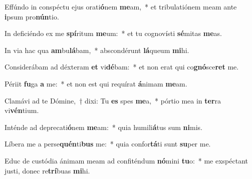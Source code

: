 \item Effúndo in conspéctu ejus orati\textbf{ó}nem \textbf{me}am,~* et tribulatiónem meam ante \textbf{i}psum pro\textbf{nún}tio.
\item In deficiéndo ex me \textbf{spí}ritum \textbf{me}um:~* et tu cognovísti \textbf{sé}mitas \textbf{me}as.
\item In via hac qua \textbf{am}bu\textbf{lá}bam,~* abscondérunt \textbf{lá}queum \textbf{mi}hi.
\item Considerábam ad déxteram \textbf{et} vi\textbf{dé}bam:~* et non erat qui co\textbf{gnó}sce\textbf{ret} me.
\item Périit \textbf{fu}ga \textbf{a} me:~* et non est qui requírat \textbf{á}nimam \textbf{me}am.
\item Clamávi ad te Dómine,~† dixi: Tu \textbf{es} spes \textbf{me}a,~* pórtio mea in \textbf{ter}ra vi\textbf{vén}tium.
\item Inténde ad deprecati\textbf{ó}nem \textbf{me}am:~* quia humili\textbf{á}tus sum \textbf{ni}mis.
\item Líbera me a perse\textbf{quén}ti\textbf{bus} me:~* quia confor\textbf{tá}ti sunt \textbf{su}per me.
\item Educ de custódia ánimam meam ad confiténdum \textbf{nó}mini \textbf{tu}o:~* me exspéctant ju\-sti, donec re\textbf{trí}buas \textbf{mi}hi.
